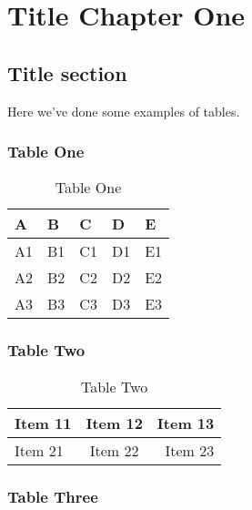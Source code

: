\chapter{Title Chapter One}

\section{Title section}

Here we've done some examples of tables.

\subsection{Table One}
\begin{table}[h]
  \centering
  \begin{tabular}{|lllll|}
    \toprule
    A  & B  & C  & D  & E  \\
    \midrule
    A1 & B1 & C1 & D1 & E1 \\
    A2 & B2 & C2 & D2 & E2 \\
    A3 & B3 & C3 & D3 & E3 \\
    \bottomrule
  \end{tabular}
  \caption{Table One}
\end{table}

\subsection{Table Two}

\begin{table}[h]
  \centering
  \begin{tabular}{|l|c|r|}
    \hline
    Item 11 & Item 12 & Item 13 \\
    \hline
    Item 21 & Item 22 & Item 23 \\
    \hline
  \end{tabular}
  \caption{Table Two}
\end{table}

\subsection{Table Three}

